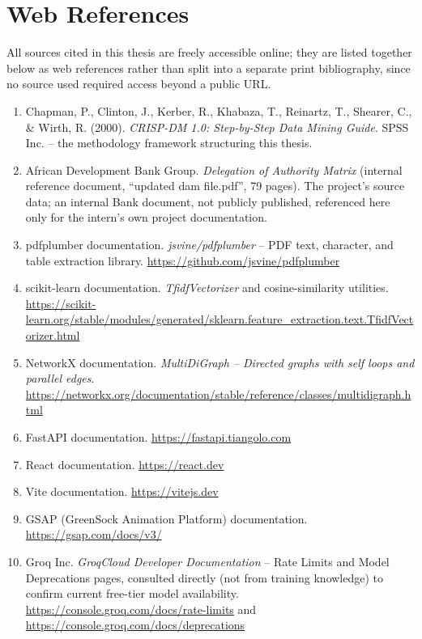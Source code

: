 \chapter*{Web References}

\noindent All sources cited in this thesis are freely accessible online; they are listed together below as web references rather than split into a separate print bibliography, since no source used required access beyond a public URL.

\begin{enumerate}[leftmargin=1.4cm,itemsep=8pt]
  \item Chapman, P., Clinton, J., Kerber, R., Khabaza, T., Reinartz, T., Shearer, C., \& Wirth, R. (2000). \textit{CRISP-DM 1.0: Step-by-Step Data Mining Guide}. SPSS Inc. -- the methodology framework structuring this thesis.
  \item African Development Bank Group. \textit{Delegation of Authority Matrix} (internal reference document, ``updated dam file.pdf'', 79 pages). The project's source data; an internal Bank document, not publicly published, referenced here only for the intern's own project documentation.
  \item pdfplumber documentation. \textit{jsvine/pdfplumber} -- PDF text, character, and table extraction library. \url{https://github.com/jsvine/pdfplumber}
  \item scikit-learn documentation. \textit{TfidfVectorizer} and cosine-similarity utilities. \url{https://scikit-learn.org/stable/modules/generated/sklearn.feature_extraction.text.TfidfVectorizer.html}
  \item NetworkX documentation. \textit{MultiDiGraph -- Directed graphs with self loops and parallel edges}. \url{https://networkx.org/documentation/stable/reference/classes/multidigraph.html}
  \item FastAPI documentation. \url{https://fastapi.tiangolo.com}
  \item React documentation. \url{https://react.dev}
  \item Vite documentation. \url{https://vitejs.dev}
  \item GSAP (GreenSock Animation Platform) documentation. \url{https://gsap.com/docs/v3/}
  \item Groq Inc. \textit{GroqCloud Developer Documentation} -- Rate Limits and Model Deprecations pages, consulted directly (not from training knowledge) to confirm current free-tier model availability. \url{https://console.groq.com/docs/rate-limits} and \url{https://console.groq.com/docs/deprecations}

\end{enumerate}
